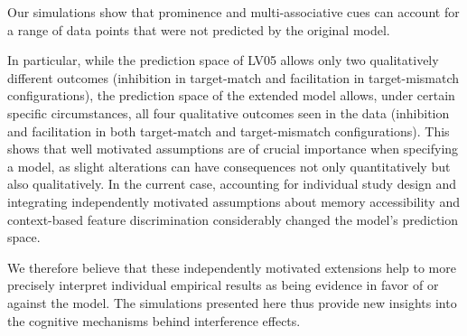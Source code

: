 \documentclass{cambridge7A}\usepackage[]{graphicx}\usepackage[]{color}
\newcommand{\revFE}[1]{#1}
\begin{document}
% 
Our simulations show that prominence and multi-associative cues can account for a range of data points that were not predicted by the original model. 
\revFE{
In particular, while the prediction space of LV05 allows only two qualitatively different outcomes (inhibition in target-match and facilitation in target-mismatch configurations), the prediction space of the extended model allows, under certain specific circumstances, all four qualitative outcomes seen in the data (inhibition and facilitation in both target-match and target-mismatch configurations). 
This shows that well motivated assumptions are of crucial importance when specifying a model, as slight alterations can have consequences not only quantitatively but also qualitatively.
In the current case, accounting for individual study design and integrating independently motivated assumptions about memory accessibility and \index{context} context-based feature discrimination considerably changed the model's prediction space.
}
We therefore believe that these independently motivated extensions help to more precisely interpret individual empirical results as being evidence in favor of or against the model. 
The simulations presented here thus provide new insights into the cognitive mechanisms behind interference effects.
\end{document}

